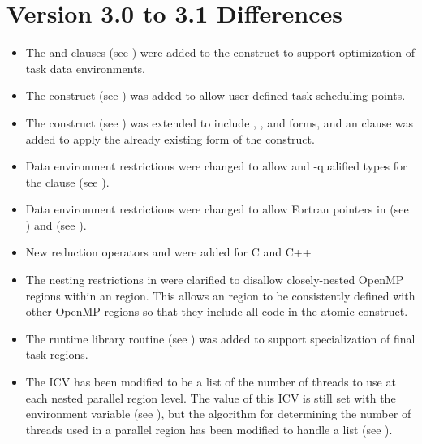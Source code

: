 \section{Version 3.0 to 3.1 Differences}
\label{sec:Version 3.0 to 3.1 Differences}
\begin{itemize}
\item The  and  clauses (see 
) were added to 
the  construct to support optimization of task data environments.

\item The  construct (see 
) was added to allow 
user-defined task scheduling points.

\item The  construct (see 
) was extended to include 
, , and  forms, and an  clause was added to apply 
the already existing form of the  construct.

\item Data environment restrictions were changed to allow  and 
-qualified types for the  clause (see 
).

\item Data environment restrictions were changed to allow Fortran pointers in 
 (see 
) 
and  (see 
).

\item New reduction operators  and  were added for C and C++ 

\item The nesting restrictions in 
 were clarified to disallow 
closely-nested OpenMP regions within an  region. This allows an  
region to be consistently defined with other OpenMP regions so that they include all 
code in the atomic construct.

\item The  runtime library routine (see 
) was 
added to support specialization of final task regions.

\item The  ICV has been modified to be a list of the number of threads to use 
at each nested parallel region level. The value of this ICV is still set with the 
 environment variable (see 
), but the 
algorithm for determining the number of threads used in a parallel region has been 
modified to handle a list (see 
).


\end{itemize}
